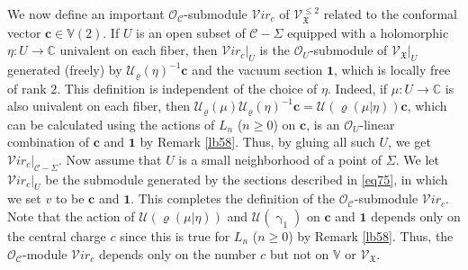 \documentclass[12pt,a4paper,notitlepage]{report}
\theoremstyle{definition}
\theoremstyle{plain}
\newcommand{\fk}{\mathfrak}
\newcommand{\mc}{\mathcal}
\newcommand{\id}{\mathbf{1}}
\newcommand{\scr}{\mathscr}
\newcommand{\Vbb}{\mathbb V}
\newcommand{\Cbb}{\mathbb C}
\newcommand{\cbf}{\mathbf c}
\newcommand{\svir}{\mathcal V\!\mathit{ir}}
\numberwithin{equation}{section}
\begin{document}
We now define an important $\scr O_{\mc C}$-submodule $\svir_c$ \index{Virc@$\svir_c$} of $\scr V_{\fk X}^{\leq 2}$ related to the conformal vector $\cbf\in\Vbb(2)$.  If $U$ is an open subset of $\mc C-\Sigma$ equipped with a holomorphic $\eta:U\rightarrow\Cbb$ univalent on each fiber, then $\svir_c|_U$ is the  $\scr O_U$-submodule of $\scr V_{\fk X}|_U$ generated (freely) by $\mc U_\varrho(\eta)^{-1}\cbf$ and the vacuum section $\id$, which is locally free of rank $2$. This definition is independent of the choice of $\eta$. Indeed, if $\mu:U\rightarrow\Cbb$ is also univalent on each fiber, then $\mc U_\varrho(\mu)\mc U_\varrho(\eta)^{-1}\cbf=\mc U(\varrho(\mu|\eta))\cbf$, which can be calculated using the actions of $L_n$ ($n\geq 0$) on $\cbf$, is an $\scr O_U$-linear combination of $\cbf$ and $\id$ by Remark \ref{lb58}. Thus, by gluing all such $U$, we get $\svir_c|_{\mc C-\Sigma}$. Now assume that $U$ is a small neighborhood of a point of $\Sigma$. We let $\svir_c|_U$ be the submodule generated by the sections described in \eqref{eq75}, in which we set $v$ to be $\cbf$ and $\id$. This completes the definition of the $\scr O_{\mc C}$-submodule $\svir_c$. Note that the action of $\mc U(\varrho(\mu|\eta))$ and $\mc U(\upgamma_1)$ on $\cbf$ and $\id$ depends only on the central charge $c$ since this is true for $L_n$ ($n\geq 0$) by Remark \ref{lb58}. Thus, the $\scr O_{\mc C}$-module $\svir_c$ depends only on the number $c$ but not on $\Vbb$ or $\scr V_{\fk X}$.
\end{document}
